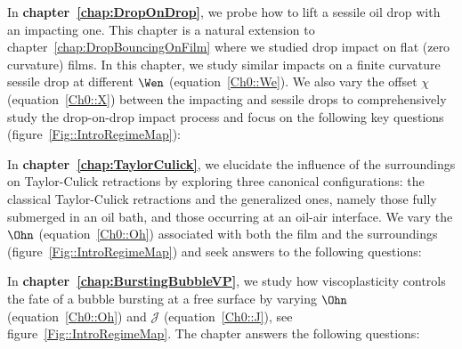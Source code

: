 In \textbf{chapter~\ref{chap:DropOnDrop}}, we probe how to lift a sessile oil drop with an impacting one. This chapter is a natural extension to chapter~\ref{chap:DropBouncingOnFilm} where we studied drop impact on flat (zero curvature) films. In this chapter, we study similar impacts on a finite curvature sessile drop at different $\Wen$ (equation~\eqref{Ch0::We}). We also vary the offset $\chi$ (equation~\eqref{Ch0::X}) between the impacting and sessile drops to comprehensively study the drop-on-drop impact process and focus on the following key questions (figure~\ref{Fig::IntroRegimeMap}):\vspace{1.25mm}

\vspace{1.25mm}

In \textbf{chapter~\ref{chap:TaylorCulick}}, we elucidate the influence of the surroundings on Taylor-Culick retractions by exploring three canonical configurations: the classical Taylor-Culick retractions and the generalized ones, namely those fully submerged in an oil bath, and those occurring at an oil-air interface. We vary the $\Ohn$ (equation~\eqref{Ch0::Oh}) associated with both the film and the surroundings (figure~\ref{Fig::IntroRegimeMap}) and seek answers to the following questions:\vspace{1.25mm}

\vspace{1.25mm}

In \textbf{chapter~\ref{chap:BurstingBubbleVP}}, we study how viscoplasticity controls the fate of a bubble bursting at a free surface by varying $\Ohn$ (equation~\eqref{Ch0::Oh}) and $\mathcal{J}$ (equation~\eqref{Ch0::J}), see figure~\ref{Fig::IntroRegimeMap}. The chapter answers the following questions:\vspace{1.25mm}


